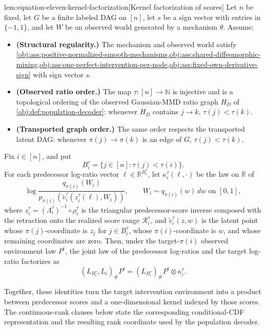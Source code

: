 \begin{lemmav}{lem:equation-eleven-kernel-factorization}[Kernel factorization of scores]
Let \(n\) be fixed, let \(G\) be a finite labeled DAG on \([n]\), let \(s\) be a sign vector with entries in \(\{-1,1\}\), and let \(W\) be an observed world generated by a mechanism \(\theta\). Assume:
\begin{itemize}
\item \textbf{(Structural regularity.)} The mechanism and observed world satisfy \cref{obj:ass:positive-normalized-smooth-mechanisms,obj:ass:shared-diffeomorphic-mixing,obj:ass:one-perfect-intervention-per-node,obj:ass:fixed-own-derivative-sign} with sign vector \(s\).
\item \textbf{(Observed ratio order.)} The map \(\tau:[n]\to\mathbb N\) is injective and is a topological ordering of the observed Gaussian-MMD ratio graph \(H_D\) of \cref{obj:def:population-decoder}: whenever \(H_D\) contains \(j\to k\), \(\tau(j)<\tau(k)\).
\item \textbf{(Transported graph order.)} The same order respects the transported latent DAG: whenever \(\pi(j)\to\pi(k)\) is an edge of \(G\), \(\tau(j)<\tau(k)\).
\end{itemize}
Fix \(i\in[n]\), and put
\[
B_i^\tau=\{j\in[n]:\tau(j)<\tau(i)\}.
\]
For each predecessor log-ratio vector \(\ell\in\mathbb R^{B_i^\tau}\), let \(\kappa_i^\tau(\ell,\cdot)\) be the law on \(\mathbb R\) of
\[
\log\frac{q_{\pi(i)}(W_i)}{p_{\pi(i)}\!\left(\widetilde v_i^\tau(z_i^\tau(\ell),W_i)\right)},
\qquad W_i\sim q_{\pi(i)}(w)\,dw \text{ on }[0,1],
\]
where \(z_i^\tau=(\Lambda_i^\tau)^{-1}\circ\rho_i^\tau\) is the triangular predecessor-score inverse composed with the retraction onto the realized score range \(\mathcal R_i^\tau\), and \(\widetilde v_i^\tau(z,w)\) is the latent point whose \(\pi(j)\)-coordinate is \(z_j\) for \(j\in B_i^\tau\), whose \(\pi(i)\)-coordinate is \(w\), and whose remaining coordinates are zero. Then, under the target-\(\pi(i)\) observed environment law \(P^i\), the joint law of the predecessor log-ratios and the target log-ratio factorizes as
\[
(L_{B_i^\tau},L_i)_{\#}P^i
=
(L_{B_i^\tau})_{\#}P^i\otimes \kappa_i^\tau .
\]
\end{lemmav}

Together, these identities turn the target intervention environment into a product between predecessor scores and a one-dimensional kernel indexed by those scores. The continuous-rank clauses below state the corresponding conditional-CDF representation and the resulting rank coordinate used by the population decoder.

